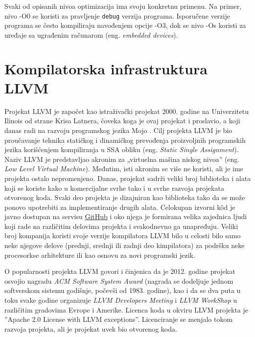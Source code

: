 \documentclass[12pt,oneside]{memoir}
\begin{document}
Svaki od opisanih nivoa optimizacija ima svoju konkretnu primenu. Na primer, nivo -O0 se koristi za pravljenje \texttt{debug} verzija programa. Isporučene verzije programa se često kompiliraju navođenjem opcije -O3, dok se nivo -Os koristi za uređaje sa ugrađenim računarom (eng. \textit{embedded devices}).

\section{Kompilatorska infrastruktura LLVM}
Projekat LLVM \cite{llvm} je započet kao istraživački projekat 2000. godine na Univerzitetu 
Ilinois od strane Krisa Latnera, čoveka koga je ovaj projekat i proslavio, a koji danas radi na razvoju programskog jezika Mojo \cite{mojo}. Cilj projekta LLVM je bio proučavanje tehnika statičkog i dinamičkog prevođenja proizvoljnih programskih jezika korišćenjem kompiliranja u SSA obliku (eng. \textit{Static Single Assignment}). Naziv LLVM je predstavljao akronim za „virtuelna 
mašina niskog nivoa” (eng. \textit{Low Level Virtual Machine}). Međutim, isti akronim se 
više ne koristi, ali je ime projekta ostalo nepromenjeno. Danas, projekat 
sadrži veliki broj biblioteka i alata koji se koriste kako u komercijalne svrhe 
tako i u svrhe razvoja projekata otvorenog koda. Svaki deo projekta je 
dizajniran kao biblioteka tako da se može ponovo upotrebiti za implementiranje 
drugih alata. Celokupan izvorni kôd je javno dostupan na servisu \href{https://github.com/llvm/llvm-project}{GitHub} i oko njega je 
formirana velika zajednica ljudi koji rade na različitim delovima projekta i 
svakodnevno ga unapređuju. Veliki broj kompanija koristi svoje verzije 
kompilatora LLVM bilo u celosti bilo samo neke njegove delove (prednji, srednji 
ili zadnji deo kimpilatora) za podršku neke procesorkse arhitekture ili kao 
osnovu za novi programski jezik. 

O popularnosti projekta LLVM govori i činjenica da je 2012. godine projekat osvojio nagradu 
\textit{ACM Software System Award} \cite{acm} (nagrada se dodeljuje jednom softverskom sistemu 
godišnje, počevši od 1983. godine), kao i da se dva puta u toku svake godine organizuje \textit{LLVM 
Developers Meeting} i \textit{LLVM WorkShop} u različitim gradovima Evrope i Amerike. Licenca koda u okviru 
LLVM projekta je ”Apache 2.0 License with LLVM exceptions”. Licenciranje se menjalo tokom razvoja 
projekta, ali je projekat uvek bio otvorenog koda.
\end{document}
